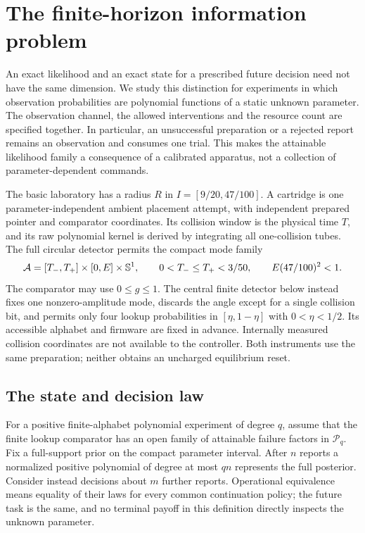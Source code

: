 \section{The finite-horizon information problem}\label{sec:scope}
An exact likelihood and an exact state for a prescribed future decision
need not have the same dimension. We study this distinction for experiments
in which observation probabilities are polynomial functions of a static
unknown parameter. The observation channel, the allowed interventions and
the resource count are specified together. In particular, an unsuccessful
preparation or a rejected report remains an observation and consumes one
trial. This makes the attainable likelihood family a consequence of a
calibrated apparatus, not a collection of parameter-dependent commands.

The basic laboratory has a radius $R$ in $I=[9/20,47/100]$. A cartridge is
one parameter-independent ambient placement attempt, with independent
prepared pointer and comparator coordinates. Its collision window is the
physical time $T$, and its raw polynomial kernel is derived by integrating
all one-collision tubes. The full circular detector permits the compact
mode family
\[
 \mathcal A=[T_-,T_+]\times[0,E]\times\mathbb S^1,
 \qquad 0<T_-\le T_+<3/50,\qquad E(47/100)^2<1.
\]
The comparator may use $0\le g\le1$. The central finite detector below
instead fixes one nonzero-amplitude mode, discards the angle except for a
single collision bit, and permits only four lookup probabilities in
$[\eta,1-\eta]$ with $0<\eta<1/2$. Its accessible alphabet and firmware are
fixed in advance. Internally measured collision coordinates are not
available to the controller. Both instruments use the same preparation;
neither obtains an uncharged equilibrium reset.

\subsection{The state and decision law}
For a positive finite-alphabet polynomial experiment of degree $q$, assume
that the finite lookup comparator has an open family of attainable failure
factors in $\mathcal P_q$. Fix a full-support prior on the compact parameter
interval. After $n$ reports a normalized positive polynomial of degree at
most $qn$ represents the full posterior. Consider instead decisions about
$m$ further reports. Operational equivalence means equality of their laws
for every common continuation policy; the future task is the same, and no
terminal payoff in this definition directly inspects the unknown parameter.

